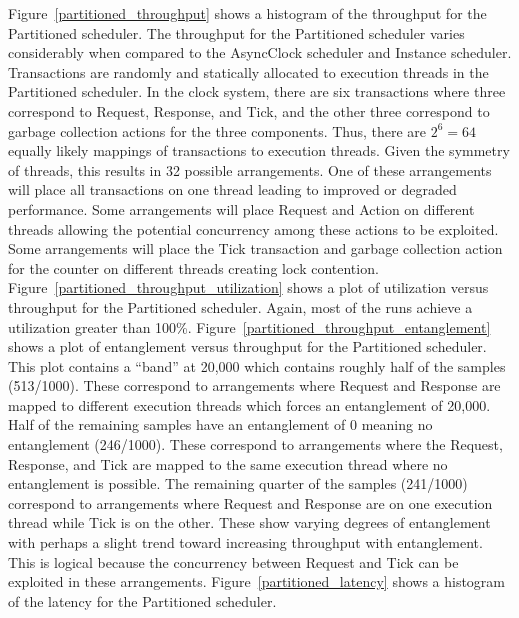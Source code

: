Figure~\ref{partitioned_throughput} shows a histogram of the throughput for the Partitioned scheduler.
The throughput for the Partitioned scheduler varies considerably when compared to the AsyncClock scheduler and Instance scheduler.
Transactions are randomly and statically allocated to execution threads in the Partitioned scheduler.
In the clock system, there are six transactions where three correspond to Request, Response, and Tick, and the other three correspond to garbage collection actions for the three components.
Thus, there are $2^6 = 64$ equally likely mappings of transactions to execution threads.
Given the symmetry of threads, this results in 32 possible arrangements.
One of these arrangements will place all transactions on one thread leading to improved or degraded performance.
Some arrangements will place Request and Action on different threads allowing the potential concurrency among these actions to be exploited.
Some arrangements will place the Tick transaction and garbage collection action for the counter on different threads creating lock contention.
Figure~\ref{partitioned_throughput_utilization} shows a plot of utilization versus throughput for the Partitioned scheduler.
Again, most of the runs achieve a utilization greater than 100\%.
Figure~\ref{partitioned_throughput_entanglement} shows a plot of entanglement versus throughput for the Partitioned scheduler.
This plot contains a ``band'' at 20,000 which contains roughly half of the samples (513/1000).
These correspond to arrangements where Request and Response are mapped to different execution threads which forces an entanglement of 20,000.
Half of the remaining samples have an entanglement of 0 meaning no entanglement (246/1000).
These correspond to arrangements where the Request, Response, and Tick are mapped to the same execution thread where no entanglement is possible.
The remaining quarter of the samples (241/1000) correspond to arrangements where Request and Response are on one execution thread while Tick is on the other.
These show varying degrees of entanglement with perhaps a slight trend toward increasing throughput with entanglement.
This is logical because the concurrency between Request and Tick can be exploited in these arrangements.
Figure~\ref{partitioned_latency} shows a histogram of the latency for the Partitioned scheduler.

